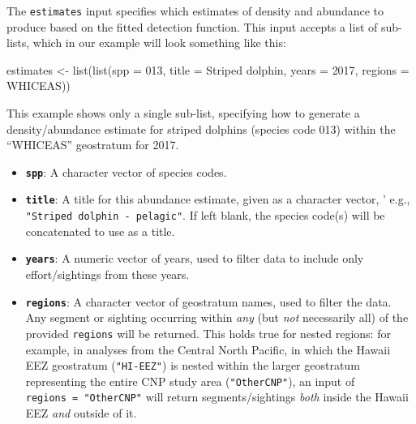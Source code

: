 \documentclass[
]{book}
\newenvironment{Shaded}{\begin{snugshade}}{\end{snugshade}}
\newcommand{\AttributeTok}[1]{\textcolor[rgb]{0.77,0.63,0.00}{#1}}
\newcommand{\DecValTok}[1]{\textcolor[rgb]{0.00,0.00,0.81}{#1}}
\newcommand{\FunctionTok}[1]{\textcolor[rgb]{0.00,0.00,0.00}{#1}}
\newcommand{\NormalTok}[1]{#1}
\newcommand{\OtherTok}[1]{\textcolor[rgb]{0.56,0.35,0.01}{#1}}
\newcommand{\StringTok}[1]{\textcolor[rgb]{0.31,0.60,0.02}{#1}}
\begin{document}
The \texttt{estimates} input specifies which estimates of density and abundance to produce based on the fitted detection function. This input accepts a list of sub-lists, which in our example will look something like this:

\begin{Shaded}
\begin{Highlighting}[]
\NormalTok{estimates }\OtherTok{\textless{}{-}} \FunctionTok{list}\NormalTok{(}\FunctionTok{list}\NormalTok{(}\AttributeTok{spp =} \StringTok{\textquotesingle{}013\textquotesingle{}}\NormalTok{,}
                       \AttributeTok{title =} \StringTok{\textquotesingle{}Striped dolphin\textquotesingle{}}\NormalTok{,}
                       \AttributeTok{years =} \DecValTok{2017}\NormalTok{,}
                       \AttributeTok{regions =} \StringTok{\textquotesingle{}WHICEAS\textquotesingle{}}\NormalTok{))}
\end{Highlighting}
\end{Shaded}

This example shows only a single sub-list, specifying how to generate a density/abundance estimate for striped dolphins (species code 013) within the ``WHICEAS'' geostratum for 2017.

\begin{itemize}
\item
  \textbf{\texttt{spp}}: A character vector of species codes.
\item
  \textbf{\texttt{title}}: A title for this abundance estimate, given as a character vector, ' e.g., \texttt{"Striped\ dolphin\ -\ pelagic"}. If left blank, the species code(s) will be concatenated to use as a title.
\item
  \textbf{\texttt{years}}: A numeric vector of years, used to filter data to include only effort/sightings from these years.
\item
  \textbf{\texttt{regions}}: A character vector of geostratum names, used to filter the data. Any segment or sighting occurring within \emph{any} (but \emph{not} necessarily all) of the provided \texttt{regions} will be returned. This holds true for nested regions: for example, in analyses from the Central North Pacific, in which the Hawaii EEZ geostratum (\texttt{"HI-EEZ"}) is nested within the larger geostratum representing the entire CNP study area (\texttt{"OtherCNP"}), an input of \texttt{regions\ =\ "OtherCNP"} will return segments/sightings \emph{both} inside the Hawaii EEZ \emph{and} outside of it.
\end{itemize}
\end{document}
